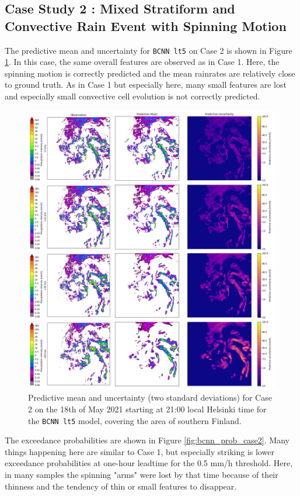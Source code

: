 \subsection{Case Study 2 : Mixed Stratiform and Convective Rain Event with Spinning Motion}

The predictive mean and uncertainty for \texttt{BCNN lt5} on Case 2 is shown in Figure \ref{fig:bcnn_mean_case2}. In this case, the same overall features are observed as in Case 1. Here, the spinning motion is correctly predicted and the mean rainrates are relatively close to ground truth. As in Case 1 but especially here, many small features are lost and especially small convective cell evolution is not correctly predicted. 

\begin{figure}[H]
	\centering
	\includegraphics[width=\textwidth]{images/cases/bcnn_mean_case2}
	\caption{Predictive mean and uncertainty (two standard deviations) for Case 2 on the 18th of May 2021 starting at 21:00 local Helsinki time for the \texttt{BCNN lt5} model, covering the area of southern Finland.}
	\label{fig:bcnn_mean_case2}
\end{figure}

The exceedance probabilities are shown in Figure \ref{fig:bcnn_prob_case2}. Many things happening here are similar to Case 1, but especially striking is lower exceedance probabilities at one-hour leadtime for the 0.5 mm/h threshold. Here, in many samples the spinning "arms" were lost by that time because of their thinness and the tendency of thin or small features to disappear. 

